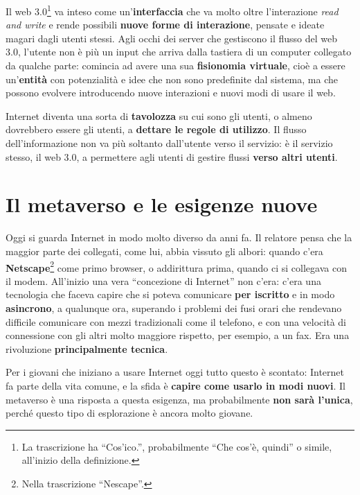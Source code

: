 Il web 3.0\footnote{La trascrizione ha ``Cos'ico.'', probabilmente ``Che cos'è,
quindi'' o simile, all'inizio della definizione.} va inteso come
un'\textbf{interfaccia} che va molto oltre l'interazione \emph{read and write}
e rende possibili \textbf{nuove forme di interazione}, pensate e ideate magari
dagli utenti stessi. Agli occhi dei server che gestiscono il flusso del web 3.0,
l'utente non è più un input che arriva dalla tastiera di un computer collegato
da qualche parte: comincia ad avere una sua \textbf{fisionomia virtuale}, cioè a
essere un'\textbf{entità} con potenzialità e idee che non sono predefinite dal
sistema, ma che possono evolvere introducendo nuove interazioni e nuovi modi di
usare il web.

Internet diventa una sorta di \textbf{tavolozza} su cui sono gli utenti, o
almeno dovrebbero essere gli utenti, a \textbf{dettare le regole di utilizzo}.
Il flusso dell'informazione non va più soltanto dall'utente verso il servizio:
è il servizio stesso, il web 3.0, a permettere agli utenti di gestire flussi
\textbf{verso altri utenti}.

\section{Il metaverso e le esigenze nuove}
\label{z8:sec:esigenza}

Oggi si guarda Internet in modo molto diverso da anni fa. Il relatore pensa che
la maggior parte dei collegati, come lui, abbia vissuto gli albori: quando
c'era \textbf{Netscape}\footnote{Nella trascrizione ``Nescape''.} come primo
browser, o addirittura prima, quando ci si collegava con il modem. All'inizio
una vera ``concezione di Internet'' non c'era: c'era una tecnologia che faceva
capire che si poteva comunicare \textbf{per iscritto} e in modo
\textbf{asincrono}, a qualunque ora, superando i problemi dei fusi orari che
rendevano difficile comunicare con mezzi tradizionali come il telefono, e con
una velocità di connessione con gli altri molto maggiore rispetto, per esempio,
a un fax. Era una rivoluzione \textbf{principalmente tecnica}.

Per i giovani che iniziano a usare Internet oggi tutto questo è scontato:
Internet fa parte della vita comune, e la sfida è \textbf{capire come usarlo in
modi nuovi}. Il metaverso è una risposta a questa esigenza, ma probabilmente
\textbf{non sarà l'unica}, perché questo tipo di esplorazione è ancora molto
giovane.

